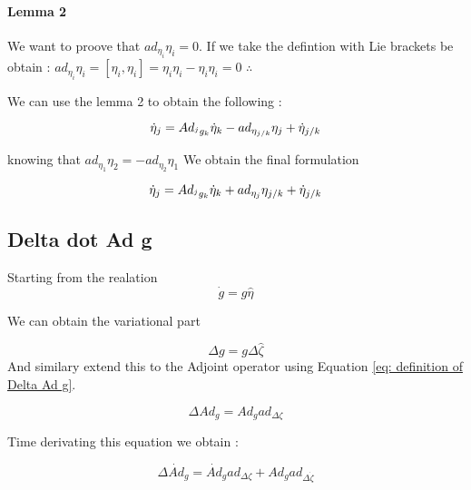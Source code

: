 \documentclass[12pt,a4paper]{book}
\begin{document}
\paragraph{Lemma 2}
We want to proove that $ad_{\eta_i} \eta_i = 0$. If we take the defintion with Lie brackets be obtain : $ad_{\eta_i} \eta_i = \left[ \eta_i, \eta_i\right] = \eta_i \eta_i - \eta_i \eta_i = 0$ $\therefore$



We can use the lemma 2 to obtain the following : 

\begin{equation}\label{eq:twist derivative 5}
	\dot{\eta}_j 	= Ad_{^jg_k} \dot{\eta}_k - ad_{{\eta}_{j/k}}  \eta_j + \dot{\eta}_{j/k} \\
\end{equation}


knowing that $ad_{\eta_1} \eta_2 = - ad_{\eta_2} \eta_1$ We obtain the final formulation

\begin{equation}\label{eq:twist derivative final}
	\dot{\eta}_j 	= Ad_{^jg_k} \dot{\eta}_k + ad_{{\eta}_j}  \eta_{j/k} + \dot{\eta}_{j/k} \\
\end{equation}





\subsection{Delta dot Ad g}

Starting from the realation 
\begin{equation}
	\dot{g} = g \hat{\eta}
\end{equation}

We can obtain the variational part 

\begin{equation}
	\Delta g = g \Delta \hat{\zeta}
\end{equation}
 And similary extend this to the Adjoint operator using Equation \eqref{eq: definition of Delta Ad g}.

\begin{equation}\label{eq: Delta Ad g}
	\Delta Ad_g = Ad_g ad_{\Delta \zeta}
\end{equation}


Time derivating this equation we obtain :

\begin{equation}
	\Delta \dot{Ad}_g = \dot{Ad}_g ad_{\Delta \zeta} + Ad_g  ad_{\Delta \dot{\zeta} }
\end{equation}
\end{document}
